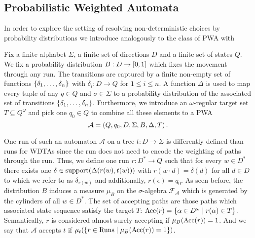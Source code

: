 \subsection{Probabilistic Weighted Automata}
In order to explore the setting of resolving non-deterministic choices by
probability distributions we introduce analogously to
\cite[Definition 4.1.1]{RandAutoInfTrees} the class of \ac{PWA} with
\begin{definition}
  Fix a finite alphabet $\Sigma$, a finite set of directions $D$ and a finite
  set of states $Q$. We fix a probability distribution
  $B:D\rightarrow\left[0,1\right]$ which fixes the movement through any run. The
  transitions are captured by a finite non-empty set of functions
  $\left\{\delta_{1},\dots,\delta_{n}\right\}$ with $\delta_{i}:D\rightarrow Q$ for
  $1\leq i\leq n$. A function $\Delta$ is used to map every tuple of any
  $q\in Q$ and $\sigma\in\Sigma$ to a probability distribution of the
  associated set of transitions $\left\{\delta_{1},\dots,\delta_{n}\right\}$.
  Furthermore, we introduce an $\omega$-regular target set
  $T\subseteq Q^{\omega}$ and pick one $q_{0}\in Q$ to combine all these
  elements to a \ac{PWA}
  \begin{equation*}
    \mathcal{A} = \left(Q, q_{0}, D, \Sigma, B, \Delta, T\right).
  \end{equation*}
\end{definition}
One run of such an automaton $\mathcal{A}$ on a tree $t:D\rightarrow\Sigma$ is
differently defined than runs for \acp{WDTA} since the run does not need to
encode the weighting of paths through the run. Thus, we define one run
$r:D^{*}\rightarrow Q$ such that for every $w\in D^{*}$ there exists one
$\delta\in\operatorname{support}(\Delta(r(w), t(w)))$ with $r(w\cdot d) = \delta(d)$ for
all $d\in D$ to which we refer to as $\delta_{r(w)}$ and additionally,
$r(\epsilon) = q_{0}$. As seen before, the distribution $B$ induces a measure
$\mu_{B}$ on the $\sigma$-algebra $\mathcal{F}_{\mathcal{A}}$ which is
generated by the cylinders of all $w\in D^{*}$. The set of accepting paths are
those paths which associated state sequence satisfy the target $T$:
$\operatorname{Acc}(r)=\left\{\alpha\in D^{\omega}\mid r(\alpha)\in T\right\}$. Semantically, $r$ is
considered almost-surely accepting if $\mu_{B}(\operatorname{Acc}(r)) = 1$. And we say that
$\mathcal{A}$ accepts $t$ if $\mu_{t}(\left\{r\in\operatorname{Runs}\mid\mu_{B}(\operatorname{Acc}(r)) = 1\right\})$.

